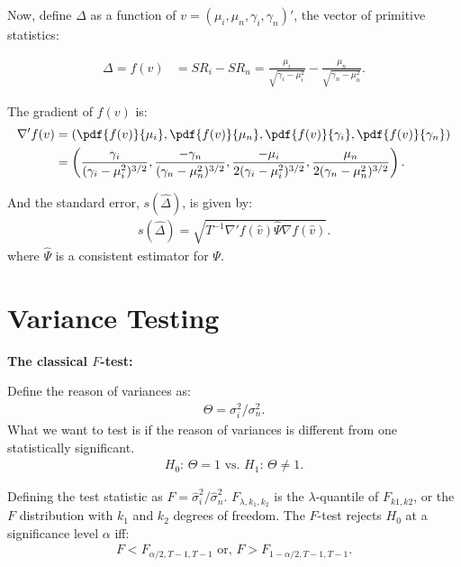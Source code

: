 \documentclass[12pt,oneside,a4paper]{article}
\begin{document}
Now, define $\Delta$ as a function of $v = (\mu_{i}, \mu_{n}, \gamma_{i}, \gamma_{n})'$, the vector of primitive statistics:

\begin{align}
\Delta = f(v) &= SR_{i} - SR_{n} = 
\frac{\mu_{i}}{\sqrt{\gamma_{i} - \mu^2_{i}}} - \frac{\mu_{n}}{\sqrt{\gamma_{n} - \mu^2_{n}}}.
\end{align}

The gradient of $f(v)$ is:
\begin{align*}
\nabla' f(v) &=
\left( 
\pdf{f(v)}{\mu_{i}},
\pdf{f(v)}{\mu_{n}},
\pdf{f(v)}{\gamma_{i}},
\pdf{f(v)}{\gamma_{n}}
\right)
\\ &=
\left( 
\frac{ \gamma_{i}}{(\gamma_{i} - \mu_{i}^2)^{3/2}},
\frac{-\gamma_{n}}{(\gamma_{n} - \mu_{n}^2)^{3/2}}, 
\frac{-\mu_{i}}{2(\gamma_{i} - \mu_{i}^2)^{3/2}},  
\frac{ \mu_{n}}{2(\gamma_{n} - \mu_{n}^2)^{3/2}}
\right).
\end{align*}

And the standard error, $s(\hat{\Delta})$, is given by:
\begin{align*}
s(\hat{\Delta}) = \sqrt{T^{-1} \nabla'f(\hat{v}) \hat{\Psi} \nabla f(\hat{v})}.
\end{align*}
where $\hat{\Psi}$ is a consistent estimator for $\Psi$.

\clearpage 

\section{Variance Testing}

\textbf{The classical $F$-test:}

Define the reason of variances as:
\begin{align}
	\Theta=\sigma^2_{i}/\sigma^2_{n}.
\end{align}
What we want to test is if the reason of variances is different from one statistically significant.
\begin{align*}
	H_{0}: \,\Theta = 1
	\text{ vs. }
	H_{1}: \,\Theta \neq 1.
\end{align*}

Defining the test statistic as $F=\hat{\sigma}^2_{i}/\hat{\sigma}^2_{n}$.
$F_{\lambda, k_{1}, k_{2}}$ is the $\lambda$-quantile of $F_{k1, k2}$, or the $F$ distribution with $k_{1}$ and $k_{2}$ degrees of freedom.
The $F$-test rejects $H_{0}$ at a significance level $\alpha$ iff:
\begin{align*}
	F < F_{\alpha/2, T-1, T-1} 
	\text{ or, }
	F > F_{1-\alpha/2, T-1, T-1}.
\end{align*}
\end{document}
